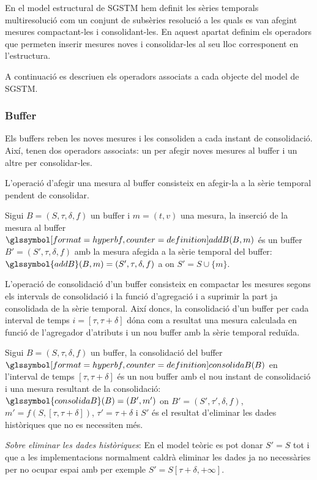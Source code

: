 En el model estructural de \gls{SGSTM} hem definit les sèries temporals
multiresolució com un conjunt de subsèries resolució a les quals es
van afegint mesures compactant-les i consolidant-les. En aquest
apartat definim els operadors que permeten inserir mesures noves i
consolidar-les al seu lloc corresponent en l'estructura.

A continuació es descriuen els operadors associats a cada objecte del
model de \gls{SGSTM}.


\subsubsection{Buffer}

Els buffers reben les noves mesures i les consoliden a cada instant de
consolidació. Així, tenen dos operadors associats: un per afegir noves
mesures al buffer i un altre per consolidar-les.


L'operació d'afegir una mesura al buffer consisteix en afegir-la a la
sèrie temporal pendent de consolidar.
\begin{definition}
  \label{def:sgstm:addB}
  Sigui $B=(S,\tau,\delta,f)$ un buffer i $m=(t,v)$ una mesura, la
  inserció de la mesura al buffer $\glssymboldef{addB}(B,m)$ és un
  buffer $B'=(S',\tau,\delta,f)$ amb la mesura afegida a la sèrie
  temporal del buffer: $\glssymbol{addB}(B,m) = (S',\tau,\delta,f)$ a
  on $S'=S\cup \{m\}$.
\end{definition}


L'operació de consolidació d'un buffer consisteix en compactar les
mesures segons els intervals de consolidació i la funció d'agregació i
a suprimir la part ja consolidada de la sèrie temporal.  Així doncs,
la consolidació d'un buffer per cada interval de temps
$i=[\tau,\tau+\delta]$ dóna com a resultat una mesura calculada en
funció de l'agregador d'atributs i un nou buffer amb la sèrie temporal
reduïda.
\begin{definition}\label{def:model:consolidacio-buffer}
  Sigui $B=(S,\tau,\delta,f)$ un buffer, la consolidació del buffer
  $\glssymboldef{consolidaB}(B)$ en l'interval de temps
  $[\tau,\tau+\delta]$ és un nou buffer amb el nou instant de
  consolidació i una mesura resultant de la consolidació:
  $\glssymbol{consolidaB}(B) = (B',m')$ on $B'=(S',\tau',\delta,f)$,
  $m'=f(S,[\tau,\tau+\delta])$, $\tau'=\tau+\delta$ i $S'$ és el
  resultat d'eliminar les dades històriques que no es necessiten més.

  \emph{Sobre eliminar les dades històriques}: En el model teòric es
  pot donar $S'=S$ tot i que a les implementacions normalment caldrà
  eliminar les dades ja no necessàries per no ocupar espai amb per
  exemple $S'= S[\tau+\delta,+\infty]$.
\end{definition}


